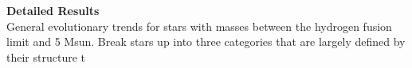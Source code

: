 \textbf{Detailed Results} \\
General evolutionary trends for stars with masses between the hydrogen fusion limit and 5 Msun. Break stars up into three categories that are largely defined by their structure t